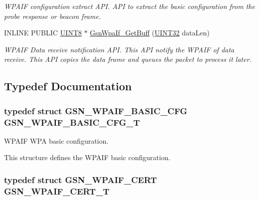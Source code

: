 \begin{DoxyCompactItemize}
\begin{DoxyCompactList}\small\item\em WPAIF configuration extract API. API to extract the basic configuration from the probe response or beacon frame. \end{DoxyCompactList}\item 
INLINE PUBLIC \hyperlink{a00660_gab27e9918b538ce9d8ca692479b375b6a}{UINT8} $\ast$ \hyperlink{a00687_gae1ac16436501065ce3743135464cacb2}{GsnWpaIf\_\-GetBuff} (\hyperlink{a00660_gae1e6edbbc26d6fbc71a90190d0266018}{UINT32} dataLen)
\begin{DoxyCompactList}\small\item\em WPAIF Data receive notification API. This API notify the WPAIF of data receive. This API copies the data frame and queues the packet to process it later. \end{DoxyCompactList}\end{DoxyCompactItemize}


\subsection{Typedef Documentation}
\hypertarget{a00687_gae101e1cf8fc4d75a8d0f652d2a4fa298}{
\subsubsection[{GSN\_\-WPAIF\_\-BASIC\_\-CFG\_\-T}]{\setlength{\rightskip}{0pt plus 5cm}typedef struct {\bf GSN\_\-WPAIF\_\-BASIC\_\-CFG} {\bf GSN\_\-WPAIF\_\-BASIC\_\-CFG\_\-T}}}
\label{a00687_gae101e1cf8fc4d75a8d0f652d2a4fa298}


WPAIF WPA basic configuration. 

This structure defines the WPAIF basic configuration. \hypertarget{a00687_ga00bd42b52d889cc88227a999dda345d9}{
\subsubsection[{GSN\_\-WPAIF\_\-CERT\_\-T}]{\setlength{\rightskip}{0pt plus 5cm}typedef struct {\bf GSN\_\-WPAIF\_\-CERT}  {\bf GSN\_\-WPAIF\_\-CERT\_\-T}}}
\label{a00687_ga00bd42b52d889cc88227a999dda345d9}


